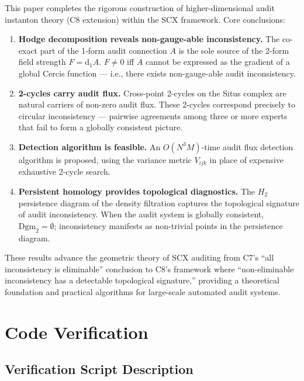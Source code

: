 \documentclass[12pt,a4paper]{article}
\theoremstyle{plain}
\theoremstyle{definition}
\theoremstyle{remark}
\newcommand{\dd}{\mathrm{d}}
\begin{document}
This paper completes the rigorous construction of higher-dimensional audit instanton theory (C8 extension) within the SCX framework. Core conclusions:

\begin{enumerate}[label=(\arabic*), leftmargin=*]
    \item \textbf{Hodge decomposition reveals non-gauge-able inconsistency.} The co-exact part of the 1-form audit connection $A$ is the sole source of the 2-form field strength $F = \dd_1 A$. $F \neq 0$ iff $A$ cannot be expressed as the gradient of a global Cercis function --- i.e., there exists non-gauge-able audit inconsistency.
    \item \textbf{2-cycles carry audit flux.} Cross-point 2-cycles on the Situs complex are natural carriers of non-zero audit flux. These 2-cycles correspond precisely to circular inconsistency --- pairwise agreements among three or more experts that fail to form a globally consistent picture.
    \item \textbf{Detection algorithm is feasible.} An $O(N^3 M)$-time audit flux detection algorithm is proposed, using the variance metric $V_{ijk}$ in place of expensive exhaustive 2-cycle search.
    \item \textbf{Persistent homology provides topological diagnostics.} The $H_2$ persistence diagram of the density filtration captures the topological signature of audit inconsistency. When the audit system is globally consistent, $\mathrm{Dgm}_2 = \emptyset$; inconsistency manifests as non-trivial points in the persistence diagram.
\end{enumerate}

These results advance the geometric theory of SCX auditing from C7's ``all inconsistency is eliminable'' conclusion to C8's framework where ``non-eliminable inconsistency has a detectable topological signature,'' providing a theoretical foundation and practical algorithms for large-scale automated audit systems.

\appendix

\section{Code Verification}
\label{sec:code_verify}

\subsection{Verification Script Description}
\end{document}
